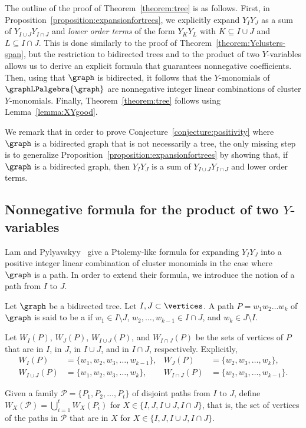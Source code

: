 The outline of the proof of Theorem~\ref{theorem:tree} is as follows.
First, in Proposition~\ref{proposition:expansionfortrees},
we explicitly expand \(Y_IY_J\) as a sum of \(Y_{I \cup J}Y_{I \cap J}\) and \emph{lower order terms} of the form \(Y_{K}Y_{L}\) with \(K \subseteq I \cup J\) and \(L \subseteq I \cap J\).
This is done similarly to the proof of Theorem~\ref{theorem:Yclusters-span},
but the restriction to bidirected trees and to the product of two \(Y\)-variables allows us to derive an explicit formula that guarantees nonnegative coefficients.
Then, using that \(\graph\) is bidirected, it follows that the \(Y\)-monomials of \(\graphLPalgebra{\graph}\) are nonnegative integer linear combinations of cluster \(Y\)-monomials.
Finally, Theorem~\ref{theorem:tree} follows using Lemma~\ref{lemma:XYgood}.

We remark that in order to prove Conjecture~\ref{conjecture:positivity} where \(\graph\) is a bidirected graph that is not necessarily a tree, the only missing step is to generalize Proposition~\ref{proposition:expansionfortrees} by showing that, if \(\graph\) is a bidirected graph, then \(Y_IY_J\) is a sum of \(Y_{I \cup J}Y_{I \cap J}\) and lower order terms.

\subsection{Nonnegative formula for the product of two \texorpdfstring{\(Y\)}{Y}-variables}

Lam and Pylyavskyy~\cite[Theorem 6.1]{linearLP} give a Ptolemy-like formula for expanding \(Y_IY_J\) into a positive integer linear combination of cluster monomials in the case where \(\graph\) is a path.
In order to extend their formula, we introduce the notion of a path from \(I\) to \(J\).

\begin{defi}
    Let \(\graph\) be a bidirected tree.
    Let \(I, J \subset \vertices\).
    A path \(P = w_1w_2\dots w_k\) of \(\graph\) is said to be a 
    if \(w_1 \in I \setminus J\), \(w_2, \dots, w_{k-1} \in I \cap J\), and \(w_k \in J \setminus I\).

    Let \(W_I(P)\), \(W_J(P)\), \(W_{I \cup J}(P)\), and \(W_{I \cap J}(P)\)
    be the sets of vertices of \(P\) that are in \(I\), in \(J\), in \(I \cup J\), and in \(I \cap J\), respectively.
    Explicitly,
    \begin{align*}
        W_I(P) & = \{w_1, w_2, w_3, \dots, w_{k-1}\}, &
        W_J(P) & = \{w_2, w_3, \dots, w_k\}, \\
        W_{I \cup J}(P) & = \{w_1, w_2, w_3, \dots, w_k\}, &
        W_{I \cap J}(P) & = \{w_2, w_3, \dots, w_{k-1}\}.
    \end{align*}

    Given a family \(\mathcal{P} = \{P_1, P_2, \dots, P_t\}\) of disjoint paths from \(I\) to \(J\),
    define \(W_X(\mathcal{P}) = \bigcup_{i=1}^t W_X(P_i)\) for \(X \in \{I, J, I \cup J, I \cap J\}\),
    that is, the set of vertices of the paths in \(\mathcal{P}\) that are in \(X\) for \(X \in \{I, J, I \cup J, I \cap J\}\).
\end{defi}

